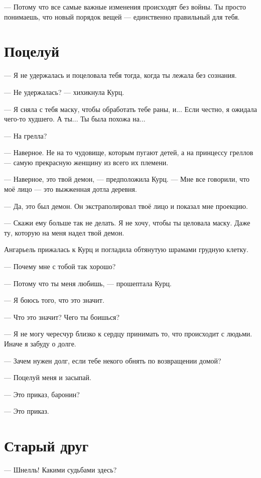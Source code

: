 \documentclass[a4paper,12pt,fleqn]{book}\usepackage{polyglossia}\setdefaultlanguage[babelshorthands=true]{russian}\setotherlanguage{english}\defaultfontfeatures{Ligatures=TeX,Mapping=tex-text}\usepackage{xcolor}\newcommand{\ml}[3]{#2}
\begin{document}
--- Потому что все самые важные изменения происходят без войны.
Ты просто понимаешь, что новый порядок вещей --- единственно правильный для тебя.

\section{Поцелуй}

--- Я не удержалась и поцеловала тебя тогда, когда ты лежала без сознания.

--- Не удержалась? --- хихикнула Курц.

--- Я сняла с тебя маску, чтобы обработать тебе раны, и...
Если честно, я ожидала чего-то худшего.
А ты...
Ты была похожа на...

--- На грелла?

--- Наверное.
Не на то чудовище, которым пугают детей, а на принцессу греллов --- самую прекрасную женщину из всего их племени.

--- Наверное, это твой демон, --- предположила Курц.
--- Мне все говорили, что моё лицо --- это выжженная дотла деревня.

--- Да, это был демон.
Он экстраполировал твоё лицо и показал мне проекцию.

--- Скажи ему больше так не делать.
Я не хочу, чтобы ты целовала маску.
Даже ту, которую на меня надел твой демон.

Ангарьель прижалась к Курц и погладила обтянутую шрамами грудную клетку.

--- Почему мне с тобой так хорошо?

--- Потому что ты меня любишь, --- прошептала Курц.

--- Я боюсь того, что это значит.

--- Что это значит?
Чего ты боишься?

--- Я не могу чересчур близко к сердцу принимать то, что происходит с людьми.
Иначе я забуду о долге.

--- Зачем нужен долг, если тебе некого обнять по возвращении домой?

--- Поцелуй меня и засыпай.

--- Это приказ, баронин?

--- Это приказ.

\section{Старый друг}

--- Шнелль!
Какими судьбами здесь?
\end{document}
